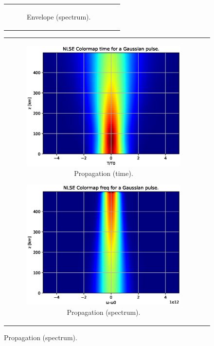 \begin{figure}[label={fig:n1nb}, caption={Solution of the NLSE using SSFM for N=1 and $\beta_2 < 0$.}]
\begin{tabular}[c]{cc}
\begin{subfigure}[b]{.53\textwidth}
            \caption{Envelope (spectrum).}
            \label{fig:eN1nbs}
        \end{subfigure}
        \end{tabular}
        \begin{tabular}[c]{cc}
        \centering	
        \begin{subfigure}[b]{.53\textwidth}
		    \centering	
            \includegraphics[width=1\linewidth]{figures/chap3/SSFM/N1nbt.eps}
            \caption{Propagation (time).}
            \label{fig:N1nbt}
        \end{subfigure}
        \hfill
        \begin{subfigure}[b]{.53\textwidth}
		    \centering	
            \includegraphics[width=1\linewidth]{figures/chap3/SSFM/N1nbs.eps}
            \caption{Propagation (spectrum).}
            \label{fig:N1nbs}
        \end{subfigure}
        \end{tabular}
        \end{figure}

